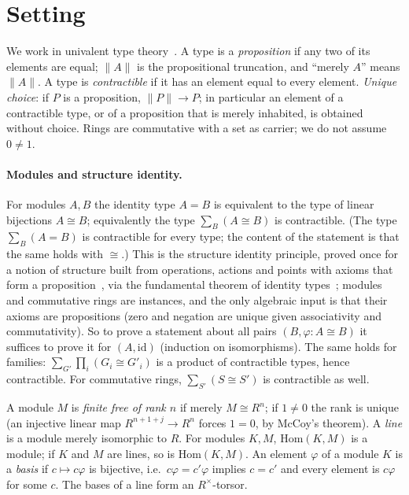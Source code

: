 \documentclass[11pt]{amsart}
\theoremstyle{definition}
\theoremstyle{remark}
\newcommand{\Hom}{\mathrm{Hom}}
\newcommand{\trunc}[1]{\lVert #1\rVert}
\begin{document}
\section{Setting}

We work in univalent type theory~\cite{HoTT}.  A type is a
\emph{proposition} if any two of its elements are equal; $\trunc{A}$ is
the propositional truncation, and ``merely $A$'' means $\trunc{A}$.  A
type is \emph{contractible} if it has an element equal to every element.
\emph{Unique choice}: if $P$ is a proposition, $\trunc{P}\to P$; in
particular an element of a contractible type, or of a proposition that is
merely inhabited, is obtained without choice.  Rings are commutative with
a set as carrier; we do not assume $0\neq1$.

\paragraph{Modules and structure identity.}  For modules $A,B$ the
identity type $A=B$ is equivalent to the type of linear bijections
$A\cong B$; equivalently the type $\sum_B(A\cong B)$ is contractible.
(The type $\sum_B(A=B)$ is contractible for every type; the content of the
statement is that the same holds with $\cong$.)  This is the structure
identity principle, proved once for a notion of
structure built from operations, actions and points with axioms that form
a proposition~\cite{E}, via the fundamental theorem of identity
types~\cite[Theorem~11.2.2]{R}; modules and commutative rings are
instances, and the only algebraic input is that their axioms are
propositions (zero and negation are unique given associativity and
commutativity).  So
to prove a statement about all pairs $(B,\varphi:A\cong B)$ it suffices
to prove it for $(A,\mathrm{id})$ (induction on isomorphisms).  The same
holds for families: $\sum_{G'}\prod_i(G_i\cong G'_i)$ is a product of
contractible types, hence contractible.  For commutative rings,
$\sum_{S'}(S\cong S')$ is contractible as well.

A module $M$ is \emph{finite free of rank $n$} if merely $M\cong R^n$;
if $1\neq0$ the rank is unique (an injective linear map $R^{n+1+j}\to
R^n$ forces $1=0$, by McCoy's theorem).  A \emph{line} is a module
merely isomorphic to $R$.  For modules $K,M$, $\Hom(K,M)$ is a module;
if $K$ and $M$ are lines, so is $\Hom(K,M)$.  An element $\varphi$ of a
module $K$ is a \emph{basis} if $c\mapsto c\varphi$ is bijective, i.e.\
$c\varphi=c'\varphi$ implies $c=c'$ and every element is $c\varphi$ for
some $c$.  The bases of a line form an $R^\times$-torsor.
\end{document}
